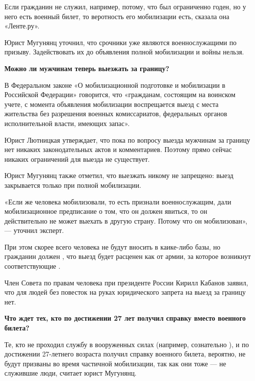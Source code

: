 Если гражданин не служил, например, потому, что был ограниченно годен, но у него есть военный билет, то веротность его мобилизации есть, сказала она «Ленте.ру».

Юрист Мугунянц уточнил, что срочники уже являются военнослужащими по призыву. Задействовать их до объявления полной мобилизации и войны нельзя.

\textbf{Можно ли мужчинам теперь выезжать за границу? }

В Федеральном законе «О мобилизационной подготовке и мобилизации в Российской Федерации» говорится, что «гражданам, состоящим на воинском учете, с момента объявления мобилизации воспрещается выезд с места жительства без разрешения военных комиссариатов, федеральных органов исполнительной власти, имеющих запас».

Юрист Лютницкая утверждает, что пока по вопросу  выезда мужчинам за границу нет никаких законодательных актов и комментариев. Поэтому прямо сейчас никаких ограничений для выезда не существует.

Юрист Мугунянц также отметил, что выезжать никому не запрещено: выезд закрывается только при полной мобилизации.

«Если же человека мобилизовали, то есть признали военнослужащим, дали мобилизационное предписание о том, что он должен явиться, то он действительно не может выехать в другую страну. Потому что он мобилизован», — уточнил эксперт.

При этом скорее всего человека не будут вносить в каике-либо базы, но гражданин должен , что выезд будет расценен как  от армии, за которое возникнут соответствующие .

Член Совета по правам человека при президенте России Кирилл Кабанов заявил, что для людей без повесток на руках юридического запрета на выезд за границу нет.

\textbf{Что ждет тех, кто по достижении 27 лет получил справку вместо военного билета?}

Те, кто не проходил службу в вооруженных силах  (например, сознательно ), и по достижении 27-летнего возраста получил справку  военного билета, вероятно, не будут призваны во время частичной мобилизации, так как они тоже — не служившие люди, считает юрист Мугунянц.

